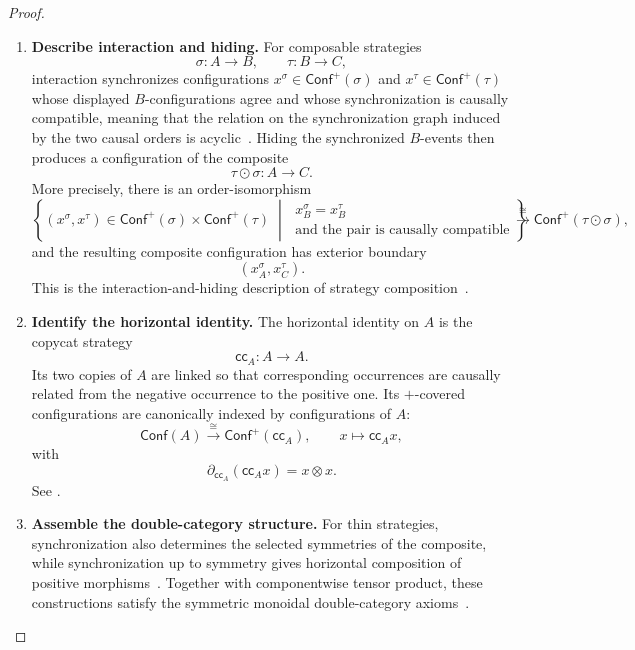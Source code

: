 \documentclass[oneside]{article}
\newcommand{\Conf}{\mathsf{Conf}}
\newcommand{\cc}{\mathsf{cc}}
\theoremstyle{plain}
\theoremstyle{definition}
\theoremstyle{remark}
\begin{document}
\begin{proof}
    \leavevmode
    \begin{enumerate}[beginpenalty=10000]
        \item \textbf{Describe interaction and hiding.}
        For composable strategies
        \[
            \sigma:A\longrightarrow B,
            \qquad
            \tau:B\longrightarrow C,
        \]
        interaction synchronizes configurations \(x^\sigma\in\Conf^+(\sigma)\) and \(x^\tau\in\Conf^+(\tau)\) whose displayed \(B\)-configurations agree and whose synchronization is causally compatible, meaning that the relation on the synchronization graph induced by the two causal orders is acyclic~\cite[\S4.2.2]{ClairambaultOlimpieriPaquet2025}. Hiding the synchronized \(B\)-events then produces a configuration of the composite
        \[
            \tau\odot\sigma:A\longrightarrow C.
        \]
        More precisely, there is an order-isomorphism
        \[
            \left\{
                (x^\sigma,x^\tau)
                \in\Conf^+(\sigma)\times\Conf^+(\tau)
                \;\middle|\;
                \begin{array}{c}
                x_B^\sigma=x_B^\tau\\
                \text{and the pair is causally compatible}
                \end{array}
            \right\}
            \xrightarrow{\cong}
            \Conf^+(\tau\odot\sigma),
        \]
        and the resulting composite configuration has exterior boundary
        \[
            (x_A^\sigma,x_C^\tau).
        \]
        This is the interaction-and-hiding description of strategy composition~\cite[Prop.~4.7]{ClairambaultOlimpieriPaquet2025}.

        \item \textbf{Identify the horizontal identity.}
        The horizontal identity on \(A\) is the copycat strategy
        \[
            \cc_A:A\longrightarrow A.
        \]
        Its two copies of \(A\) are linked so that corresponding occurrences are causally related from the negative occurrence to the positive one. Its \(+\)-covered configurations are canonically indexed by configurations of \(A\):
        \[
            \Conf(A)\xrightarrow{\cong}\Conf^+(\cc_A),
            \qquad
            x\longmapsto\cc_A x,
        \]
        with
        \[
            \partial_{\cc_A}(\cc_A x)=x\otimes x.
        \]
        See \cite[Prop.~4.6]{ClairambaultOlimpieriPaquet2025}.

        \item \textbf{Assemble the double-category structure.}
        For thin strategies, synchronization also determines the selected symmetries of the composite, while synchronization up to symmetry gives horizontal composition of positive morphisms~\cite[Props.~5.9--5.10]{ClairambaultOlimpieriPaquet2025}. Together with componentwise tensor product, these constructions satisfy the symmetric monoidal double-category axioms~\cite[Prop.~5.11]{ClairambaultOlimpieriPaquet2025}. \qedhere
    \end{enumerate}
\end{proof}
\end{document}
